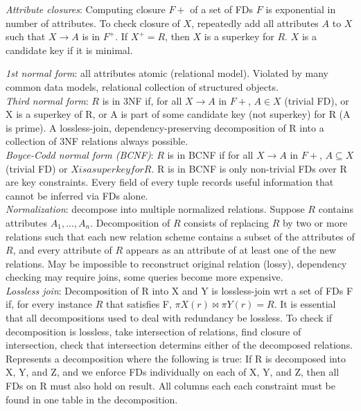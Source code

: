 \documentclass[10pt,landscape]{article}
\begin{document}
\begin{multicols}{3}
\textit{Attribute closures}: Computing closure $F+$ of a set of FDs $F$ is exponential in number of attributes. To check closure of $X$, repeatedly add all attributes $A$ to $X$ such that $X \rightarrow A$ is in $F^+$. If $X^+ = R$, then $X$ is a superkey for $R$. $X$ is a candidate key if it is minimal.

\textit{1st normal form}: all attributes atomic (relational model). Violated by many common data models, relational collection of structured objects. \\
\textit{Third normal form}: $R$ is in 3NF if, for all $X \rightarrow A$ in $F+$, $A \in X$ (trivial FD), or X is a superkey of R, or A is part of some candidate key (not superkey) for R (A is prime). A lossless-join, dependency-preserving decomposition of R into a collection of 3NF relations always possible. \\
\textit{Boyce-Codd normal form (BCNF)}: $R$ is in BCNF if for all $X \rightarrow A$ in $F+$, $A \subseteq X$ (trivial FD) or $X is a superkey for R$. R is in BCNF is only non-trivial FDs over R are key constraints. Every field of every tuple records useful information that cannot be inferred via FDs alone. \\
\textit{Normalization}: decompose into multiple normalized relations. Suppose $R$ contains attributes $A_1, \ldots, A_n$. Decomposition of $R$ consists of replacing $R$ by two or more relations such that each new relation scheme contains a subset of the attributes of $R$, and every attribute of $R$ appears as an attribute of at least one of the new relations. May be impossible to reconstruct original relation (lossy), dependency checking may require joins, some queries become more expensive. \\
\textit{Lossless join}: Decomposition of R into X and Y is lossless-join wrt a set of FDs F if, for every instance $R$ that satisfies F, $\pi X(r) \bowtie \pi Y(r) = R$. It is essential that all decompositions used to deal with redundancy be lossless. To check if decomposition is lossless, take intersection of relations, find closure of intersection, check that intersection determins either of the decomposed relations. Represents a decomposition where the following is true: If R is decomposed into X, Y, and Z, and we enforce FDs individually on each of X, Y, and Z, then all FDs on R must also hold on result. All columns each each constraint must be found in one table in the decomposition.
\end{multicols}
\end{document}
